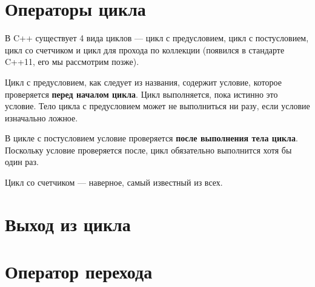 \documentclass[book.tex]{subfiles}
\begin{document}

\section*{Операторы цикла}


В C++ существует 4 вида циклов --- цикл с предусловием, цикл с постусловием, цикл со счетчиком и цикл для прохода по коллекции (появился в стандарте C++11, его мы рассмотрим позже).

Цикл с предусловием, как следует из названия, содержит условие, которое проверяется \textbf{перед началом цикла}. Цикл выполняется, пока истинно это условие. Тело цикла с предусловием может не выполниться ни разу, если условие изначально ложное.

В цикле с постусловием условие проверяется \textbf{после выполнения тела цикла}. Поскольку условие проверяется после, цикл обязательно выполнится хотя бы один раз.

Цикл со счетчиком --- наверное, самый известный из всех.

\section*{Выход из цикла}

\section*{Оператор перехода}
\end{document}
